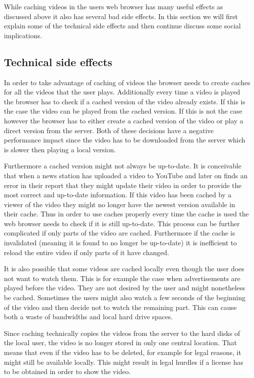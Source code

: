 While caching videos in the users web browser has many useful effects as discussed above it also has several bad side effects. In this section we will first explain some of the technical side effects and then continue discuss some social implications.

\subsection{Technical side effects}
In order to take advantage of caching of videos the browser needs to create caches for all the videos that the user plays. Additionally every time a video is played the browser has to check if a cached version of the video already exists. If this is the case the video can be played from the cached version. If this is not the case however the browser has to either create a cached version of the video or play a direct version from the server. Both of these decisions have a negative performance impact since the video has to be downloaded from the server which is slower then playing a local version.

Furthermore a cached version might not always be up-to-date. It is conceivable that when a news station has uploaded a video to YouTube and later on finds an error in their report that they might update their video in order to provide the most correct and up-to-date information. If this video has been cached by a viewer of the video they might no longer have the newest version available in their cache. Thus in order to use caches properly every time the cache is used the web browser needs to check if it is still up-to-date. This process can be further complicated if only parts of the video are cached. Furthermore if the cache is invalidated (meaning it is found to no longer be up-to-date) it is inefficient to reload the entire video if only parts of it have changed.

It is also possible that some videos are cached locally even though the user does not want to watch them. This is for example the case when advertisements are played before the video. They are not desired by the user and might nonetheless be cached. Sometimes the users might also watch a few seconds of the beginning of the video and then decide not to watch the remaining part. This can cause both a waste of bandwidths and local hard drive spaces.

Since caching technically copies the videos from the server to the hard disks of the local user, the video is no longer stored in only one central location. That means that even if the video has to be deleted, for example for legal reasons, it might still be available locally. This might result in legal hurdles if a license has to be obtained in order to show the video.

